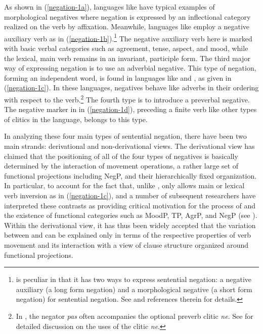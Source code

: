 \documentclass[output=paper
 	        ,biblatex
                ,babelshorthands
                ,newtxmath
                ,draftmode
                ,colorlinks, citecolor=brown
]{langscibook}
\begin{document}
\noindent
As shown in (\ref{negation-1a}), languages like 
have typical examples of morphological negatives where
negation is expressed by an inflectional category realized on the
verb by affixation. Meanwhile, languages like 
 employ a negative auxiliary verb as in (\ref{negation-1b}).\footnote{
 is peculiar in that it has two ways to
 express sentential negation: a negative auxiliary (a long form
 negation)  and a morphological negative (a short form negation)
 for sentential negation. See \citet{Kim:00,Kim:16} and references therein for details.}
  The negative auxiliary
 verb here is marked with basic verbal categories such as agreement, tense, aspect, and mood, while the lexical, main verb remains in an invariant, participle form. The third major way of expressing negation is to use an adverbial
negative. This type of negation, forming an independent word, is found in
languages like  and , as given in (\ref{negation-1c}). In these languages, negatives behave like adverbs in their ordering with respect to the verb.\footnote{In , the negator \emph{pas}
often accompanies the optional preverb clitic \emph{ne}. See \citet{Godard:2004} for detailed discussion on the uses of the clitic \emph{ne}.} The fourth
type is to introduce a preverbal negative. The negative marker in  in (\ref{negation-1d}), preceding a finite verb like other types of clitics in the language,
belongs to this type.


In analyzing these four main types of sentential negation, there have been two main strands: derivational and non-derivational views. The derivational view has claimed that the positioning of all of the
four types of negatives is basically determined by the interaction of movement
operations, a rather large set of functional projections including NegP,
and their hierarchically fixed organization.
In particular, to account for the
fact that, unlike , only  allows main or lexical verb inversion
as in (\ref{negation-1c}), \citet{Pollock:89,Pollock:94} and a number of subsequent researchers
have interpreted these contrasts as providing critical motivation for
the process of  and the existence of functional
categories such as MoodP, TP, AgrP, and NegP (see \citealt{Belletti:90, Zanuttini:97,Chomsky:91,Chomsky:93,Lasnik:95, Haegeman:95,Haegeman:97, Vikner97a-u, Zanuttini:2001, Zeijlstra:15}).
Within the derivational view, it has thus been widely
accepted that the variation between  and  can be explained only in terms of the respective properties of verb movement and its interaction with a view of clause
structure organized around functional projections.
\end{document}
